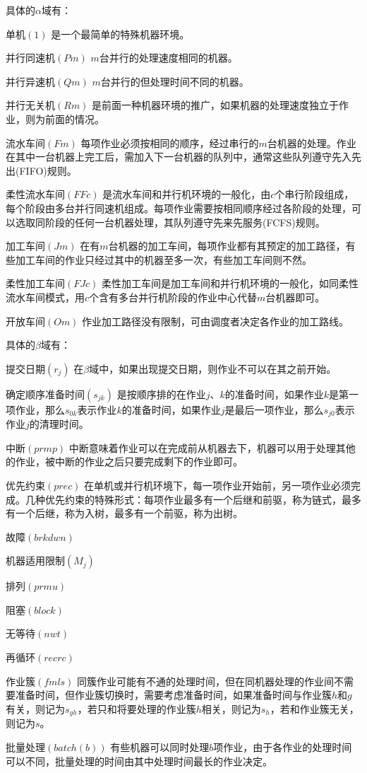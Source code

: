 具体的$\alpha$域有：
\begin{compactdesc}
\item[单机$(1)$]是一个最简单的特殊机器环境。
\item[并行同速机$(Pm)$]$m$台并行的处理速度相同的机器。
\item[并行异速机$(Qm)$]$m$台并行的但处理时间不同的机器。
\item[并行无关机$(Rm)$]是前面一种机器环境的推广，如果机器的处理速度独立于作业，则为前面的情况。
\item[流水车间$(Fm)$]每项作业必须按相同的顺序，经过串行的$m$台机器的处理。作业在其中一台机器上完工后，需加入下一台机器的队列中，通常这些队列遵守先入先出(FIFO)规则。
\item[柔性流水车间$(FFc)$]是流水车间和并行机环境的一般化，由$c$个串行阶段组成，每个阶段由多台并行同速机组成。每项作业需要按相同顺序经过各阶段的处理，可以选取同阶段的任何一台机器处理，其队列遵守先来先服务(FCFS)规则。
\item[加工车间$(Jm)$]在有$m$台机器的加工车间，每项作业都有其预定的加工路径，有些加工车间的作业只经过其中的机器至多一次，有些加工车间则不然。
\item[柔性加工车间$(FJc)$]柔性加工车间是加工车间和并行机环境的一般化，如同柔性流水车间模式，用$c$个含有多台并行机阶段的作业中心代替$m$台机器即可。
\item[开放车间$(Om)$]作业加工路径没有限制，可由调度者决定各作业的加工路线。
\end{compactdesc}

具体的$\beta$域有：
\begin{compactdesc}
\item[提交日期$(r_j)$]在$\beta$域中，如果出现提交日期，则作业不可以在其之前开始。
\item[确定顺序准备时间$(s_{jk})$]是按顺序排的在作业$j$、$k$的准备时间，如果作业$k$是第一项作业，那么$s_{0k}$表示作业$k$的准备时间，如果作业$j$是最后一项作业，那么$s_{j0}$表示作业$j$的清理时间。
\item[中断$(prmp)$]中断意味着作业可以在完成前从机器去下，机器可以用于处理其他的作业，被中断的作业之后只要完成剩下的作业即可。
\item[优先约束$(prec)$]在单机或并行机环境下，每一项作业开始前，另一项作业必须完成。几种优先约束的特殊形式：每项作业最多有一个后继和前驱，称为链式，最多有一个后继，称为入树，最多有一个前驱，称为出树。
\item[故障$(brkdwn)$]
\item[机器适用限制$(M_j)$]
\item[排列$(prmu)$]
\item[阻塞$(block)$]
\item[无等待$(nwt)$]
\item[再循环$(recrc)$]
\item[作业簇$(fmls)$]同簇作业可能有不通的处理时间，但在同机器处理的作业间不需要准备时间，但作业簇切换时，需要考虑准备时间，如果准备时间与作业簇$h$和$g$有关，则记为$s_{gh}$，若只和将要处理的作业簇$h$相关，则记为$s_h$，若和作业簇无关，则记为$s$。
\item[批量处理$(batch(b))$]有些机器可以同时处理$b$项作业，由于各作业的处理时间可以不同，批量处理的时间由其中处理时间最长的作业决定。
\end{compactdesc}

